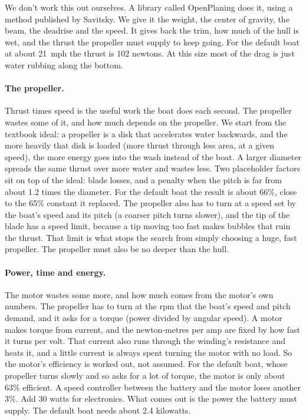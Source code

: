 \documentclass[11pt,a4paper]{article}
\renewcommand{\_}{\textunderscore\allowbreak}
\begin{document}
We don't work this out ourselves. A library called OpenPlaning does it, using a method published by Savitsky. We give it the weight, the center of gravity, the beam, the deadrise and the speed.
It gives back the trim, how much of the hull is wet, and the thrust the propeller must supply to keep going. For the default boat at about 21~mph the thrust is 102 newtons.
At this size most of the drag is just water rubbing along the bottom.

\paragraph{The propeller.} Thrust times speed is the useful work the boat does each second. The propeller wastes some of it, and how much depends on the propeller. We start from the textbook ideal: a propeller is a disk that
accelerates water backwards, and the more heavily that disk is loaded (more thrust through less area, at a given speed), the more energy goes into the wash instead of the boat. A larger diameter spreads the same thrust over more water and wastes less.
Two placeholder factors sit on top of the ideal: blade losses, and a penalty when the pitch is far from about 1.2 times the diameter. For the default boat the result is about 66\%, close to the 65\% constant it replaced.
The propeller also has to turn at a speed set by the boat's speed and its pitch (a coarser pitch turns slower), and the tip of the blade has a speed limit, because a tip moving too fast makes bubbles that ruin the thrust.
That limit is what stops the search from simply choosing a huge, fast propeller. The propeller must also be no deeper than the hull.

\paragraph{Power, time and energy.} The motor wastes some more, and how much comes from the motor's own numbers. The propeller has to turn at the rpm that the boat's speed and pitch demand, and it asks for a torque (power divided by angular speed). A motor makes torque from current, and the newton-metres per amp are fixed by how fast it turns per volt. That current also runs through the winding's resistance and heats it, and a little current is always spent turning the motor with no load. So the motor's efficiency is worked out, not assumed. For the default boat, whose propeller turns slowly and so asks for a lot of torque, the motor is only about 63\% efficient. A speed controller between the battery and the motor loses another 3\%.
Add 30 watts for electronics. What comes out is the power the battery must supply. The default boat needs about 2.4 kilowatts.
\end{document}
